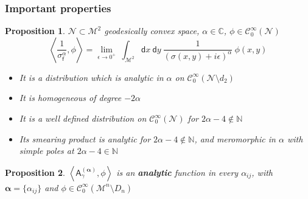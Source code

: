 \documentclass[9pt]{beamer}
\newcommand{\sm}[1]{\left\langle #1 \right\rangle}
\newcommand{\alphabd}{\boldsymbol{\alpha}}
\newcommand{\Ccal}{\mathcal{C}}
\newcommand{\Mcal}{\mathcal{M}}
\newcommand{\Ncal}{\mathcal{N}}
\newcommand{\Cbb}{\mathbb{C}}
\newcommand{\Nbb}{\mathbb{N}}
\newcommand{\Asf}{\mathsf{A}}
\newcommand{\dsf}{\mathsf{d}}
\newcommand{\fsf}{\mathsf{f}}
\newtheorem{proposition}{Proposition}
\begin{document}

\begin{frame}[label=homog]

\frametitle{Important properties}

\vfill

\begin{proposition}
$\Ncal \subset\Mcal^2$ geodesically convex space, $\alpha \in \Cbb$, $\phi \in \Ccal^\infty_0(\Ncal)$
%
\begin{equation*}
\sm{ \frac{1}{\sigma^\alpha_\fsf} , \phi } = \lim_{\epsilon \to 0^+ } \ \int_{\Mcal^2} \dsf x \ \dsf y \ \frac{1}{(\sigma(x,y)+i\epsilon)^{\alpha}} \ \phi(x,y)
\end{equation*}
%
\begin{itemize}
\setlength\itemsep{2pt}
%
\item It is a distribution which is analytic in $\alpha$ on $\Ccal^\infty_0(\Ncal\setminus d_2)$
%
\item It is homogeneous of degree $-2\alpha$ \hfill \hyperlink{details_homog}{}
%
\item It is a well defined distribution on $\Ccal^\infty_0(\Ncal)$ for $2\alpha-4 \notin \Nbb$
%
\item Its smearing product is analytic for $2\alpha-4 \notin \Nbb$, and meromorphic in $\alpha$ with simple poles at $2\alpha-4\in \Nbb$
%
\end{itemize}
%
\end{proposition}

\vfill

\begin{proposition}
\vspace*{-4pt}
$\sm{\Asf_\gamma^{(\alphabd)},\phi}$ is an \textbf{analytic} function in every $\alpha_{ij}$, with $\alphabd = \{\alpha_{ij}\}$ and $\phi\in\Ccal^\infty_0\left(\Mcal^n\setminus D_n\right)$
\end{proposition}

\vfill

\end{frame}

\end{document}
